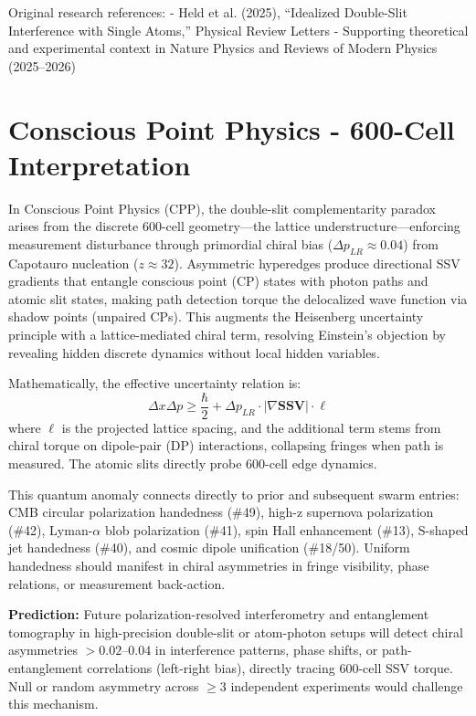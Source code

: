 \documentclass[11pt]{article}
\begin{document}
Original research references:  
- Held et al. (2025), ``Idealized Double-Slit Interference with Single Atoms,'' Physical Review Letters  
- Supporting theoretical and experimental context in Nature Physics and Reviews of Modern Physics (2025--2026)

\section{Conscious Point Physics - 600-Cell Interpretation}
In Conscious Point Physics (CPP), the double-slit complementarity paradox arises from the discrete 600-cell geometry—the lattice understructure—enforcing measurement disturbance through primordial chiral bias ($\Delta p_{LR} \approx 0.04$) from Capotauro nucleation ($z \approx 32$). Asymmetric hyperedges produce directional SSV gradients that entangle conscious point (CP) states with photon paths and atomic slit states, making path detection torque the delocalized wave function via shadow points (unpaired CPs). This augments the Heisenberg uncertainty principle with a lattice-mediated chiral term, resolving Einstein's objection by revealing hidden discrete dynamics without local hidden variables.

Mathematically, the effective uncertainty relation is:  
\[
\Delta x \Delta p \geq \frac{\hbar}{2} + \Delta p_{LR} \cdot |\nabla \mathbf{SSV}| \cdot \ell
\]  
where $\ell$ is the projected lattice spacing, and the additional term stems from chiral torque on dipole-pair (DP) interactions, collapsing fringes when path is measured. The atomic slits directly probe 600-cell edge dynamics.

This quantum anomaly connects directly to prior and subsequent swarm entries: CMB circular polarization handedness (\#49), high-z supernova polarization (\#42), Lyman-$\alpha$ blob polarization (\#41), spin Hall enhancement (\#13), S-shaped jet handedness (\#40), and cosmic dipole unification (\#18/50). Uniform handedness should manifest in chiral asymmetries in fringe visibility, phase relations, or measurement back-action.

\textbf{Prediction:} Future polarization-resolved interferometry and entanglement tomography in high-precision double-slit or atom-photon setups will detect chiral asymmetries $> 0.02$--$0.04$ in interference patterns, phase shifts, or path-entanglement correlations (left-right bias), directly tracing 600-cell SSV torque. Null or random asymmetry across $\geq 3$ independent experiments would challenge this mechanism.
\end{document}
